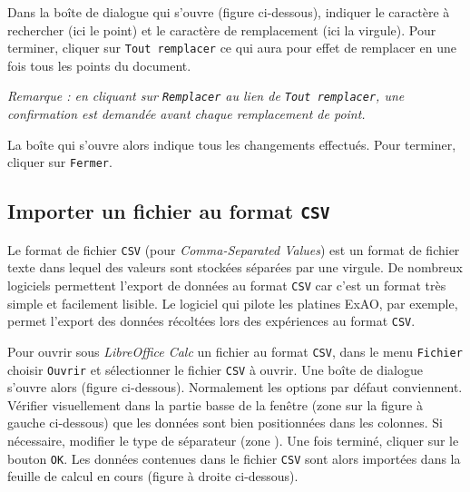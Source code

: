 Dans la boîte de dialogue qui s'ouvre (figure ci-dessous), indiquer le caractère à rechercher  (ici le point) et le caractère de remplacement  (ici la virgule). Pour terminer, cliquer sur \texttt{Tout remplacer}  ce qui aura pour effet de remplacer en une fois tous les points du document.

\vspace{6pt}

\emph{Remarque : en cliquant sur \texttt{Remplacer} au lien de \texttt{Tout remplacer}, une confirmation est demandée avant chaque remplacement de point.}


La boîte qui s'ouvre alors indique tous les changements effectués. Pour terminer, cliquer sur \texttt{Fermer}.



\subsection{Importer un fichier au format \texttt{CSV}}\label{Calc3fichierCSV}

Le format de fichier \texttt{CSV} (pour \emph{Comma-Separated Values}) est un format de fichier texte dans lequel des valeurs sont stockées séparées par une virgule. De nombreux logiciels permettent l'export de données au format \texttt{CSV} car c'est un format très simple et facilement lisible. Le logiciel qui pilote les platines ExAO, par exemple, permet l'export des données récoltées lors des expériences au format \texttt{CSV}.

\vspace{1em}

Pour ouvrir sous \emph{LibreOffice Calc} un fichier au format \texttt{CSV}, dans le menu \texttt{Fichier} choisir \texttt{Ouvrir} et sélectionner le fichier \texttt{CSV} à ouvrir. Une boîte de dialogue s'ouvre alors (figure ci-dessous). Normalement les options par défaut conviennent. Vérifier visuellement dans la partie basse de la fenêtre (zone  sur la figure à gauche ci-dessous) que les données sont bien positionnées dans les colonnes. Si nécessaire, modifier le type de séparateur (zone ). Une fois terminé, cliquer sur le bouton \texttt{OK}. 
Les données contenues dans le fichier \texttt{CSV} sont alors importées dans la feuille de calcul en cours (figure à droite ci-dessous).

